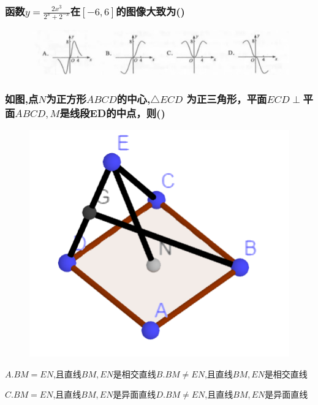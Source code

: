\documentclass[UTF8]{ctexart}
\begin{document}
\subsubsection{函数$y=\frac{2x^3}{2^x+2^{-x}}$在$[-6,6]$的图像大致为\hfill (\qquad)}
\begin{figure}[H]
    \centering
    \includegraphics[width=1\textwidth]{pics/2019_3_7.png}
\end{figure}

\subsubsection{如图,点$N$为正方形$ABCD$的中心,$\triangle ECD$
    为正三角形，平面$ECD\perp$平面$ABCD,M$是线段ED的中点，则\hfill (\qquad)}
\begin{figure}[H]
    \centering
    \includegraphics{pics/2019_3_8.png}
\end{figure}
$A. BM=EN$,且直线$BM,EN$是相交直线\hfill $B. BM\neq EN$,且直线$BM,EN$是相交直线\hfill \quad \par
$C. BM=EN$,且直线$BM,EN$是异面直线\hfill $D. BM\neq EN$,且直线$BM,EN$是异面直线\hfill \quad
\end{document}
